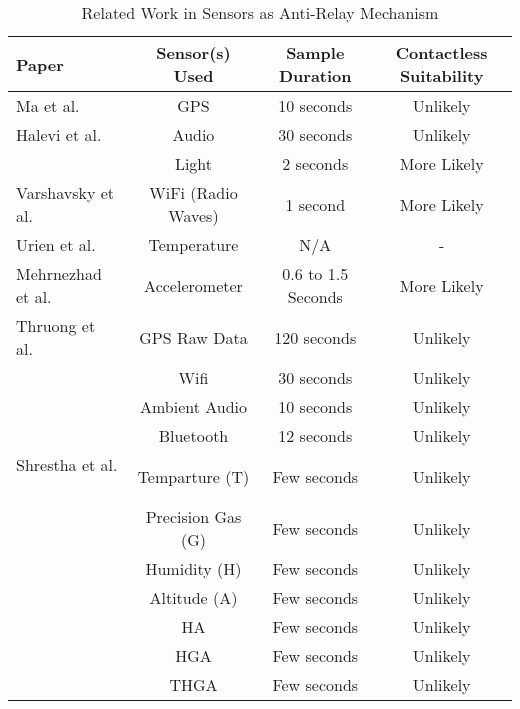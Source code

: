 \documentclass[runningheads,a4paper]{llncs}
\begin{document}
  \begin{table}[t]
	\centering
	\caption{Related Work in Sensors as Anti-Relay Mechanism}
	\label{tab:RelatedWork}

\begin{tabular}{@{}lccc@{}}
		\toprule
        \textbf{Paper} & \textbf{Sensor(s) Used} & \textbf{Sample Duration} & \textbf{Contactless Suitability} \\
        \midrule
        Ma et al.\ \cite{6378376} & GPS & 10 seconds & Unlikely \\ Halevi et al.\ \cite{Halevi2012} & Audio & 30 seconds & Unlikely \\ & Light & 2 seconds & More Likely \\ Varshavsky et al.\ \cite{Varshavsky2007} & WiFi (Radio Waves) & 1 second & More Likely \\
         Urien et al.\ \cite{Urien201428} & Temperature & N/A & - \\ 
         Mehrnezhad et al.\ \cite{mehrnezhad2014tap} & Accelerometer & 0.6 to 1.5 Seconds & More Likely\\
         Thruong et al.\ \cite{truong2014comparing} & GPS Raw Data & 120 seconds & Unlikely \\
         											& Wifi		   &  30 seconds & Unlikely \\
                                                    & Ambient Audio & 10 seconds & Unlikely \\
                                                    & Bluetooth & 12 seconds & Unlikely \\
        Shrestha et al. \ \cite{shrestha2014drone} & Temparture (T) & Few seconds & Unlikely \\
        										   & Precision Gas (G) & Few seconds & Unlikely \\
                                                   & Humidity (H) & Few seconds & Unlikely \\
                                                   & Altitude (A) & Few seconds & Unlikely \\
                                                   & HA	& Few seconds & Unlikely \\
                                                   & HGA & Few seconds & Unlikely \\
                                                   & THGA & Few seconds & Unlikely \\
		\bottomrule
		\end{tabular}
\end{table}
\end{document}
